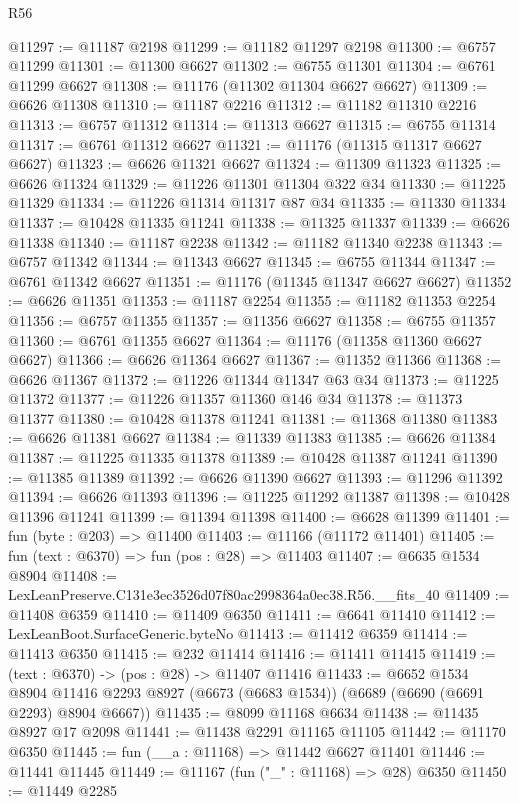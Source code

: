 \begin{lexlean}{R56}
\begin{coremodule}
@11297 := @11187 @2198
@11299 := @11182 @11297 @2198
@11300 := @6757 @11299
@11301 := @11300 @6627
@11302 := @6755 @11301
@11304 := @6761 @11299 @6627
@11308 := @11176 (@11302 @11304 @6627 @6627)
@11309 := @6626 @11308
@11310 := @11187 @2216
@11312 := @11182 @11310 @2216
@11313 := @6757 @11312
@11314 := @11313 @6627
@11315 := @6755 @11314
@11317 := @6761 @11312 @6627
@11321 := @11176 (@11315 @11317 @6627 @6627)
@11323 := @6626 @11321 @6627
@11324 := @11309 @11323
@11325 := @6626 @11324
@11329 := @11226 @11301 @11304 @322 @34
@11330 := @11225 @11329
@11334 := @11226 @11314 @11317 @87 @34
@11335 := @11330 @11334
@11337 := @10428 @11335 @11241
@11338 := @11325 @11337
@11339 := @6626 @11338
@11340 := @11187 @2238
@11342 := @11182 @11340 @2238
@11343 := @6757 @11342
@11344 := @11343 @6627
@11345 := @6755 @11344
@11347 := @6761 @11342 @6627
@11351 := @11176 (@11345 @11347 @6627 @6627)
@11352 := @6626 @11351
@11353 := @11187 @2254
@11355 := @11182 @11353 @2254
@11356 := @6757 @11355
@11357 := @11356 @6627
@11358 := @6755 @11357
@11360 := @6761 @11355 @6627
@11364 := @11176 (@11358 @11360 @6627 @6627)
@11366 := @6626 @11364 @6627
@11367 := @11352 @11366
@11368 := @6626 @11367
@11372 := @11226 @11344 @11347 @63 @34
@11373 := @11225 @11372
@11377 := @11226 @11357 @11360 @146 @34
@11378 := @11373 @11377
@11380 := @10428 @11378 @11241
@11381 := @11368 @11380
@11383 := @6626 @11381 @6627
@11384 := @11339 @11383
@11385 := @6626 @11384
@11387 := @11225 @11335 @11378
@11389 := @10428 @11387 @11241
@11390 := @11385 @11389
@11392 := @6626 @11390 @6627
@11393 := @11296 @11392
@11394 := @6626 @11393
@11396 := @11225 @11292 @11387
@11398 := @10428 @11396 @11241
@11399 := @11394 @11398
@11400 := @6628 @11399
@11401 := fun (byte : @203) => @11400
@11403 := @11166 (@11172 @11401)
@11405 := fun (text : @6370) => fun (pos : @28) => @11403
@11407 := @6635 @1534 @8904
@11408 := LexLeanPreserve.C131e3ec3526d07f80ac2998364a0ec38.R56.__fits_40
@11409 := @11408 @6359
@11410 := @11409 @6350
@11411 := @6641 @11410
@11412 := LexLeanBoot.SurfaceGeneric.byteNo
@11413 := @11412 @6359
@11414 := @11413 @6350
@11415 := @232 @11414
@11416 := @11411 @11415
@11419 := (text : @6370) -> (pos : @28) -> @11407 @11416
@11433 := @6652
    @1534
    @8904
    @11416
    @2293
    @8927
    (@6673 (@6683 @1534))
    (@6689 (@6690 (@6691 @2293) @8904 @6667))
@11435 := @8099 @11168 @6634
@11438 := @11435 @8927 @17 @2098
@11441 := @11438 @2291 @11165 @11105
@11442 := @11170 @6350
@11445 := fun (__a : @11168) => @11442 @6627 @11401
@11446 := @11441 @11445
@11449 := @11167 (fun ("_" : @11168) => @28) @6350
@11450 := @11449 @2285

\end{coremodule}
\end{lexlean}
